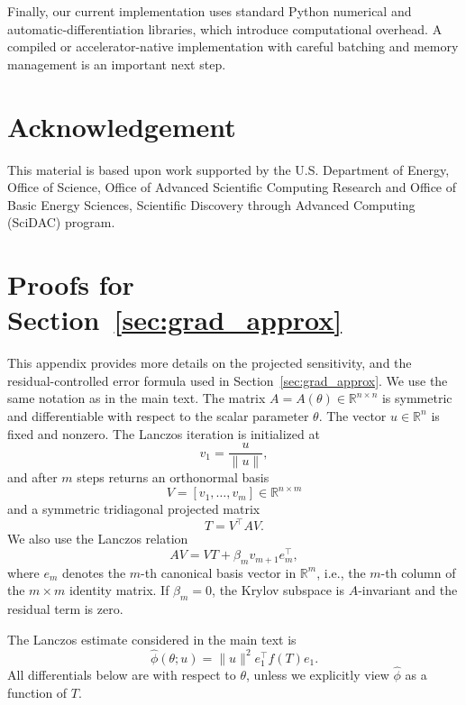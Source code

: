 \documentclass{article}
\begin{document}
Finally, our current implementation uses standard Python numerical and automatic-differentiation libraries, which introduce computational overhead. A compiled or accelerator-native implementation with careful batching and memory management is an important next step.

\section*{Acknowledgement}
This material is based upon work supported by the U.S. Department of Energy, Office of Science, Office of
Advanced Scientific Computing Research and Office of Basic Energy Sciences, Scientific Discovery through
Advanced Computing (SciDAC) program.




\appendix

\section{Proofs for Section~\ref{sec:grad_approx}}
\label{app:section4_details}

This appendix provides more details on the projected sensitivity,  and the residual-controlled error formula used in
Section~\ref{sec:grad_approx}. We use the same notation as in the main text.
The matrix \(A=A(\theta)\in\mathbb{R}^{n\times n}\) is symmetric and differentiable
with respect to the scalar parameter \(\theta\). The vector \(u\in\mathbb{R}^n\) is fixed
and nonzero. The Lanczos iteration is initialized at
\[
    v_1 = \frac{u}{\|u\|},
\]
and after \(m\) steps returns an orthonormal basis
\[
    V=[v_1,\ldots,v_m]\in\mathbb{R}^{n\times m}
\]
and a symmetric tridiagonal projected matrix
\[
    T = V^\top A V .
\]
We also use the Lanczos relation
\begin{equation}
    AV = VT+\beta_m v_{m+1}e_m^\top ,
    \label{eq:app_lanczos_relation}
\end{equation}
where \(e_m\) denotes the \(m\)-th canonical basis vector in \(\mathbb{R}^m\), i.e.,
the \(m\)-th column of the \(m\times m\) identity matrix. If \(\beta_m=0\), the Krylov subspace is
\(A\)-invariant and the residual term is zero.

The Lanczos estimate considered in the main text is
\begin{equation}
    \widehat{\phi}(\theta;u)
    =
    \|u\|^2 e_1^\top f(T)e_1 .
    \label{eq:app_lanczos_quad}
\end{equation}
All differentials below are with respect to \(\theta\), unless we explicitly view
\(\widehat{\phi}\) as a function of \(T\).
\end{document}
